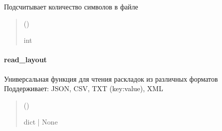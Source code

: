 \documentclass[a4paper,11pt,russian,openany,oneside]{sphinxmanual}
\begin{document}

\begin{savenotes}\begin{fulllineitems}
\label{\detokenize{scan_module:id10}}
\pysigstartsignatures
\pysiglinewithargsret
{}
{}
{}
\pysigstopsignatures
\sphinxAtStartPar
Подсчитывает количество символов в файле
\begin{quote}\begin{description}
\sphinxAtStartPar
{} ()

\sphinxAtStartPar
int

\end{description}\end{quote}

\end{fulllineitems}\end{savenotes}



\paragraph{read\_layout}
\label{\detokenize{scan_module:module-scan_module.read_layout}}\label{\detokenize{scan_module:read-layout}}

\begin{savenotes}\begin{fulllineitems}
\label{\detokenize{scan_module:scan_module.read_layout.read_kl}}
\pysigstartsignatures
\pysiglinewithargsret
{}
{}
{}
\pysigstopsignatures
\sphinxAtStartPar
Универсальная функция для чтения раскладок из различных форматов
Поддерживает: JSON, CSV, TXT (key:value), XML
\begin{quote}\begin{description}
\sphinxAtStartPar
{} ()

\sphinxAtStartPar
dict | None

\end{description}\end{quote}

\end{fulllineitems}\end{savenotes}
\end{document}
